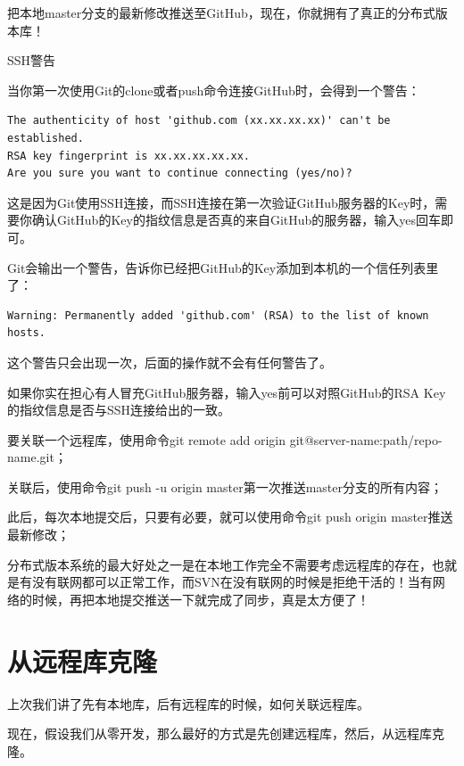 把本地master分支的最新修改推送至GitHub，现在，你就拥有了真正的分布式版本库！

SSH警告

当你第一次使用Git的clone或者push命令连接GitHub时，会得到一个警告：

\begin{verbatim}
The authenticity of host 'github.com (xx.xx.xx.xx)' can't be established.
RSA key fingerprint is xx.xx.xx.xx.xx.
Are you sure you want to continue connecting (yes/no)?
\end{verbatim}

这是因为Git使用SSH连接，而SSH连接在第一次验证GitHub服务器的Key时，需要你确认GitHub的Key的指纹信息是否真的来自GitHub的服务器，输入yes回车即可。

Git会输出一个警告，告诉你已经把GitHub的Key添加到本机的一个信任列表里了：

\begin{verbatim}
Warning: Permanently added 'github.com' (RSA) to the list of known hosts.
\end{verbatim}

这个警告只会出现一次，后面的操作就不会有任何警告了。

如果你实在担心有人冒充GitHub服务器，输入yes前可以对照GitHub的RSA Key的指纹信息是否与SSH连接给出的一致。

\begin{tcolorbox}

要关联一个远程库，使用命令git remote add origin git@server-name:path/repo-name.git；

关联后，使用命令git push -u origin master第一次推送master分支的所有内容；

此后，每次本地提交后，只要有必要，就可以使用命令git push origin master推送最新修改；

分布式版本系统的最大好处之一是在本地工作完全不需要考虑远程库的存在，也就是有没有联网都可以正常工作，而SVN在没有联网的时候是拒绝干活的！当有网络的时候，再把本地提交推送一下就完成了同步，真是太方便了！
\end{tcolorbox}

\section{从远程库克隆}
上次我们讲了先有本地库，后有远程库的时候，如何关联远程库。

现在，假设我们从零开发，那么最好的方式是先创建远程库，然后，从远程库克隆。

